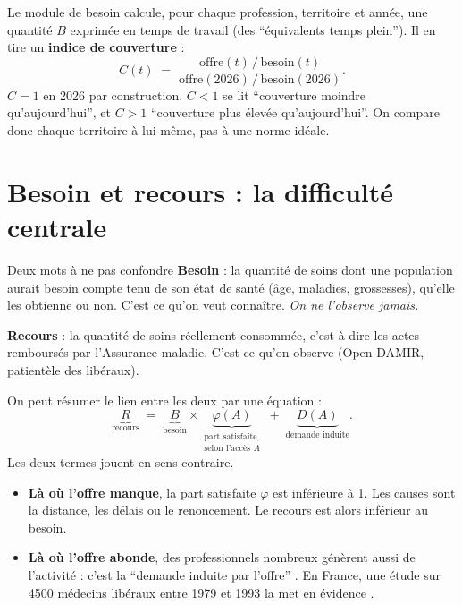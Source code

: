\documentclass[11pt]{article}
\begin{document}
Le module de besoin calcule, pour chaque profession, territoire et année, une quantité $B$ exprimée en temps de
travail (des \enquote{équivalents temps plein}). Il en tire un \textbf{indice de couverture} :
\[
C(t) \;=\; \frac{\text{offre}(t)\,/\,\text{besoin}(t)}{\text{offre}(2026)\,/\,\text{besoin}(2026)} .
\]
$C=1$ en 2026 par construction. $C<1$ se lit \enquote{couverture moindre qu'aujourd'hui}, et $C>1$ \enquote{couverture
plus élevée qu'aujourd'hui}. On compare donc chaque territoire à lui-même, pas à une norme idéale.

\section{Besoin et recours : la difficulté centrale}

\begin{encadre}{Deux mots à ne pas confondre}
\textbf{Besoin} : la quantité de soins dont une population aurait besoin compte tenu de son état de santé (âge,
maladies, grossesses), qu'elle les obtienne ou non. C'est ce qu'on veut connaître. \emph{On ne l'observe jamais.}

\medskip
\textbf{Recours} : la quantité de soins réellement consommée, c'est-à-dire les actes remboursés par l'Assurance
maladie. C'est ce qu'on observe (Open DAMIR, patientèle des libéraux).
\end{encadre}

On peut résumer le lien entre les deux par une équation :
\[
\underbrace{R}_{\text{recours}} \;=\; \underbrace{B}_{\text{besoin}} \times
\underbrace{\varphi(A)}_{\substack{\text{part satisfaite,}\\ \text{selon l'accès } A}}
\;+\; \underbrace{D(A)}_{\text{demande induite}} .
\]
Les deux termes jouent en sens contraire.
\begin{itemize}
  \item \textbf{Là où l'offre manque}, la part satisfaite $\varphi$ est inférieure à 1. Les causes sont la distance,
    les délais ou le renoncement. Le recours est alors inférieur au besoin.
  \item \textbf{Là où l'offre abonde}, des professionnels nombreux génèrent aussi de l'activité : c'est la
    \enquote{demande induite par l'offre} \citep{evans1974}. En France, une étude sur \num{4500} médecins libéraux
    entre 1979 et 1993 la met en évidence \citep{delattre2003}.
\end{itemize}
\end{document}
